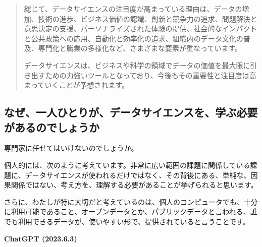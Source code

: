 \documentclass[
  xelatex, ja=standard]{bxjsbook}
\theoremstyle{definition}
\theoremstyle{definition}
\theoremstyle{definition}
\theoremstyle{definition}
\theoremstyle{remark}
\begin{document}
\begin{quote}
総じて、データサイエンスの注目度が高まっている理由は、データの増加、技術の進歩、ビジネス価値の認識、創新と競争力の追求、問題解決と意思決定の支援、パーソナライズされた体験の提供、社会的なインパクトと公共政策への応用、自動化と効率化の追求、組織内のデータ文化の普及、専門化と職業の多様化など、さまざまな要素が重なっています。

データサイエンスは、ビジネスや科学の領域でデータの価値を最大限に引き出すための力強いツールとなっており、今後もその重要性と注目度は高まっていくことが予想されます。
\end{quote}

\hypertarget{ux306aux305cux4e00ux4ebaux3072ux3068ux308aux304cux30c7ux30fcux30bfux30b5ux30a4ux30a8ux30f3ux30b9ux3092ux5b66ux3076ux5fc5ux8981ux304cux3042ux308bux306eux3067ux3057ux3087ux3046ux304b}{%
\subsection{なぜ、一人ひとりが、データサイエンスを、学ぶ必要があるのでしょうか}\label{ux306aux305cux4e00ux4ebaux3072ux3068ux308aux304cux30c7ux30fcux30bfux30b5ux30a4ux30a8ux30f3ux30b9ux3092ux5b66ux3076ux5fc5ux8981ux304cux3042ux308bux306eux3067ux3057ux3087ux3046ux304b}}

専門家に任せてはいけないのでしょうか。

個人的には、次のように考えています。非常に広い範囲の課題に関係している課題に、データサイエンスが使われるだけではなく、その背後にある、単純な、因果関係ではない、考え方を、理解する必要があることが挙げられると思います。

さらに、わたしが特に大切だと考えているのは、個人のコンピュータでも、十分に利用可能であること、オープンデータとか、パブリックデータと言われる、誰でも利用できるデータが、使いやすい形で、提供されていると言うことです。

\textbf{ChatGPT (2023.6.3)}
\end{document}
